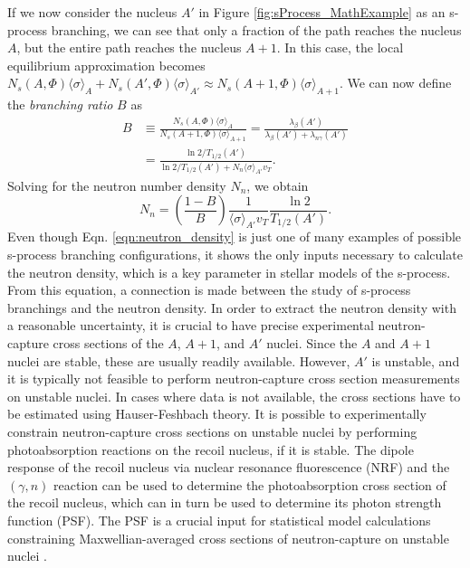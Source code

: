 If we now consider the nucleus $A'$ in Figure \ref{fig:sProcess_MathExample} as an s-process branching, we can see that only a fraction of the path reaches the nucleus $A$, but the entire path reaches the nucleus $A+1$. In this case, the local equilibrium approximation becomes $N_{s}(A,\Phi)\langle \sigma \rangle_{A} + N_{s}(A',\Phi)\langle \sigma \rangle_{A'} \approx N_{s}(A+1,\Phi)\langle \sigma \rangle_{A+1}$. We can now define the \emph{branching ratio} $B$ as
\begin{align}
B &\equiv \frac{N_{s}(A,\Phi)\langle \sigma \rangle_{A}}{N_{s}(A+1,\Phi)\langle \sigma \rangle_{A+1}} = \frac{\lambda_{\beta}(A')}{\lambda_{\beta}(A') + \lambda_{n\gamma}(A')} \nonumber \\
&= \frac{\ln 2 / T_{1/2}(A')}{\ln 2 / T_{1/2}(A') + N_{n} \langle \sigma \rangle_{A'} v_{T}}.
\end{align}
Solving for the neutron number density $N_{n}$, we obtain
\begin{equation} \label{eqn:neutron_density}
N_{n} = \left( \frac{1-B}{B} \right) \frac{1}{\langle \sigma \rangle_{A'} v_{T}} \frac{\ln 2}{T_{1/2}(A')}.
\end{equation}
Even though Eqn. \ref{eqn:neutron_density} is just one of many examples of possible s-process branching configurations, it shows the only inputs necessary to calculate the neutron density, which is a key parameter in stellar models of the s-process. From this equation, a connection is made between the study of s-process branchings and the neutron density. In order to extract the neutron density with a reasonable uncertainty, it is crucial to have precise experimental neutron-capture cross sections of the $A$, $A+1$, and $A'$ nuclei. Since the $A$ and $A+1$ nuclei are stable, these are usually readily available. However, $A'$ is unstable, and it is typically not feasible to perform neutron-capture cross section measurements on unstable nuclei. In cases where data is not available, the cross sections have to be estimated using Hauser-Feshbach theory. It is possible to experimentally constrain neutron-capture cross sections on unstable nuclei by performing photoabsorption reactions on the recoil nucleus, if it is stable. The dipole response of the recoil nucleus via nuclear resonance fluorescence (NRF) and the $(\gamma,n)$ reaction can be used to determine the photoabsorption cross section of the recoil nucleus, which can in turn be used to determine its photon strength function (PSF). The PSF is a crucial input for statistical model calculations constraining Maxwellian-averaged cross sections of neutron-capture on unstable nuclei \cite{Wilhelmy2020}.

